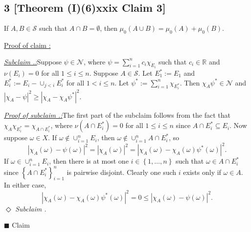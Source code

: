 \documentclass[12pt]{article}
\newcounter{ProofCounter}
\newcounter{ClaimCounter}[ProofCounter]
\newcounter{SubClaimCounter}[ClaimCounter]
\newenvironment{claimproof}[1]{\par\noindent\underline{Proof of claim \theClaimCounter:}\space#1}{\hfill $\blacksquare$ Claim \theClaimCounter}
\newenvironment{subclaim}[1]{\stepcounter{SubClaimCounter}\par\noindent\emph{\underline{Subclaim \theClaimCounter.\theSubClaimCounter:}}\space#1}{}
\newenvironment{subclaimproof}[1]{\par\noindent\emph{\underline{Proof of subclaim \theClaimCounter.\theSubClaimCounter:}}\space#1}{\hfill
$\Diamond$ \emph{Subclaim \theClaimCounter.\theSubClaimCounter}}
\begin{document}
\subsection*{3 [Theorem (I)(6)xxix Claim 3]}
\begin{tcolorbox}
If $A,B \in \mathcal{S}$ such that $A\cap B = \emptyset$, then $\mu_0(A\cup B) = \mu_0(A) + \mu_0(B)$.
\end{tcolorbox}
\begin{claimproof}
\begin{subclaim}
Suppose $\psi \in \mathcal{N}$, where $\psi = \sum_{i=1}^{n}c_{i}\chi_{E_{i}}$ such that $c_{i} \in \mathbb{R}$ and $\nu(E_{i}) = 0$ for all $1 \leq
i \leq n$. Suppose $A\in \mathcal{S}$. Let $E_{1}^{*} := E_{1}$ and $E_{i}^{*} := E_{i} - \cup_{j < i}E_{i}^{*}$ for all $1 < i \leq
n$. Let $\psi^{*} := \sum_{i=1}^{n}\chi_{E_{i}^{*}}$.
Then $\chi_{A}\psi^{*} \in \mathcal{N}$ and $|\chi_{A} - \psi|^{2} \geq |\chi_{A} - \chi_{A}\psi^*|^2$.
\end{subclaim}
\begin{subclaimproof}
The first part of the subclaim follows from the fact that $\chi_{A}\chi_{E_{i}^*} = \chi_{A\cap E_{i}^{*}}$, where $\nu(A\cap E_{i}^{*}) = 0$ 
for all $1 \leq i \leq n$ since $A\cap E_{i}^* \subseteq E_{i}$. Now suppose
$\omega \in X$. If $\omega \notin \cup_{i=1}^{n}E_{i}$, then $\omega \notin \cup_{i=1}^{n}A\cap E_{i}^{*}$, so
\[ |\chi_{A}(\omega) - \psi(\omega)|^{2} = |\chi_{A}(\omega)|^{2} = |\chi_{A}(\omega) - \chi_{A}(\omega)\psi^{*}(\omega)|^{2}. \]
If $\omega \in \cup_{i=1}^{n}E_{i}$, then there is at most one $i \in \left\{ 1, \hdots, n \right\}$ such that $\omega \in A\cap E_{i}^{*}$ since 
$\left\{ A\cap E_{i}^{*} \right\}_{i=1}^{n}$ is pairwise disjoint. Clearly one such $i$ exists only if $\omega \in A$. In either case,
\[ |\chi_{A}(\omega) - \chi_{A}(\omega)\psi^*(\omega)|^{2} = 0 \leq |\chi_{A}(\omega) - \psi(\omega)|^{2}. \]
\end{subclaimproof}

\end{claimproof}


\newpage
\end{document}
